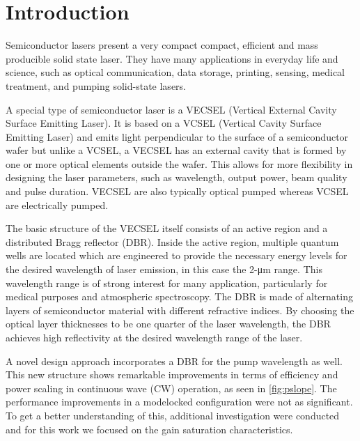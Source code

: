 \chapter{Introduction}\label{chapter:introduction}

Semiconductor lasers present a very compact compact, efficient and mass producible solid state laser. They have many applications in everyday life and science, such as optical communication, data storage, printing, sensing, medical treatment, and pumping solid-state lasers.

A special type of semiconductor laser is a VECSEL (Vertical External Cavity Surface Emitting Laser). It is based on a VCSEL (Vertical Cavity Surface Emitting Laser) and emits light perpendicular to the surface of a semiconductor wafer but unlike a VCSEL, a VECSEL has an external cavity that is formed by one or more optical elements outside the wafer. This allows for more flexibility in designing the laser parameters, such as wavelength, output power, beam quality and pulse duration. VECSEL are also typically optical pumped whereas VCSEL are electrically pumped.

The basic structure of the VECSEL itself consists of an active region and a distributed Bragg reflector (DBR). Inside the active region, multiple quantum wells are located which are engineered to provide the necessary energy levels for the desired wavelength of laser emission, in this case the 2-\unit{\um} range. This wavelength range is of strong interest for many application, particularly for medical purposes and atmospheric spectroscopy. The DBR is made of alternating layers of semiconductor material with different refractive indices. By choosing the optical layer thicknesses to be one quarter of the laser wavelength, the DBR achieves high reflectivity at the desired wavelength range of the laser. 

A novel design approach incorporates a DBR for the pump wavelength as well. This new structure shows remarkable improvements in terms of efficiency and power scaling in continuous wave (CW) operation, as seen in \cref{fig:pslope}. The performance improvements in a modelocked configuration were not as significant. To get a better understanding of this, additional investigation were conducted and for this work we focused on the gain saturation characteristics.

